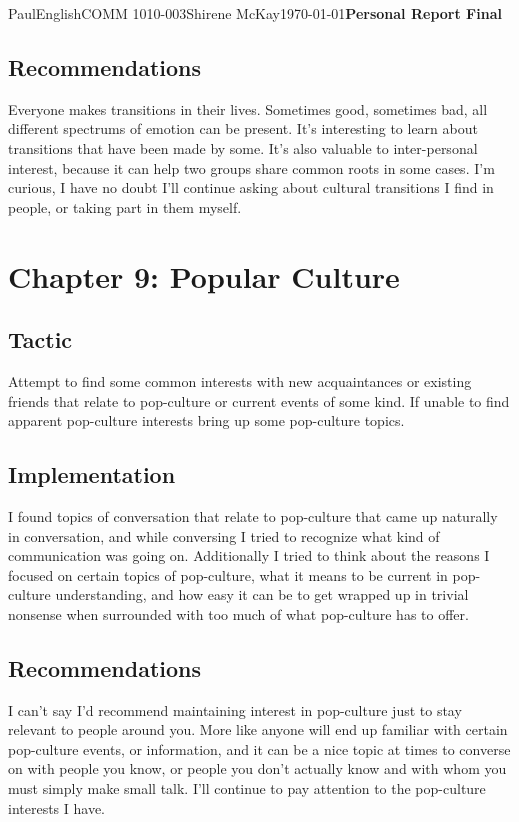 \documentclass[12pt,letterpaper]{article}
\begin{document}
\begin{mla}{Paul}{English}{COMM 1010-003}{Shirene
    McKay}{\today}{\textbf{Personal Report Final}}
\subsection{Recommendations}

Everyone makes transitions in their lives. Sometimes good, sometimes bad, all different spectrums of emotion can be present. It's interesting to learn about transitions that have been made by some. It's also valuable to inter-personal interest, because it can help two groups share common roots in some cases. I'm curious, I have no doubt I'll continue asking about cultural transitions I find in people, or taking part in them myself.

\section{Chapter 9: Popular Culture}

\subsection{Tactic}

Attempt to find some common interests with new acquaintances or existing friends that relate to pop-culture or current events of some kind. If unable to find apparent pop-culture interests bring up some pop-culture topics.

\subsection{Implementation}

I found topics of conversation that relate to pop-culture that came up naturally in conversation, and while conversing I tried to recognize what kind of communication was going on. Additionally I tried to think about the reasons I focused on certain topics of pop-culture, what it means to be current in pop-culture understanding, and how easy it can be to get wrapped up in trivial nonsense when surrounded with too much of what pop-culture has to offer.

\subsection{Recommendations}

I can't say I'd recommend maintaining interest in pop-culture just to stay relevant to people around you. More like anyone will end up familiar with certain pop-culture events, or information, and it can be a nice topic at times to converse on with people you know, or people you don't actually know and with whom you must simply make small talk. I'll continue to pay attention to the pop-culture interests I have.


\end{mla}
\end{document}

